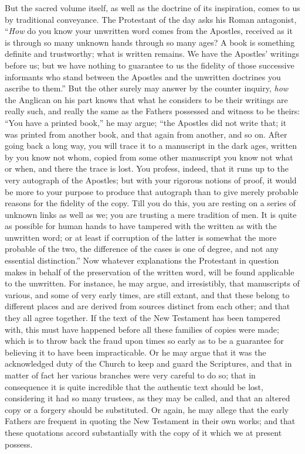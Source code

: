 But the sacred volume itself, as well as the doctrine of its
inspiration, comes to us by traditional conveyance. The Protestant of
the day asks his Roman antagonist, ``\emph{How} do you know your
unwritten word comes from the Apostles, received as it is through so
many unknown hands through so many ages? A book is something definite
and trustworthy; what is written remains. We have the Apostles'
writings before us; but we have nothing to guarantee to us the
fidelity of those successive informants who stand between the Apostles
and the unwritten doctrines you ascribe to them.'' But the other
surely may answer by the counter inquiry, \emph{how} the Anglican on
his part knows that what he considers to be their writings are really
such, and really the same as the Fathers possessed and witness to be
theirs: ``You have a printed book,'' he may argue; ``the
Apostles did not write that; it was printed from another book,
and that again from another, and so on. After going back a long way,
you will trace it to a manuscript in the dark ages, written by you
know not whom, copied from some other manuscript you know not what or
when, and there the trace is lost. You profess, indeed, that it runs
up to the very autograph of the Apostles; but with your rigorous
notions of proof, it would be more to your purpose to produce that
autograph than to give merely probable reasons for the fidelity of the
copy. Till you do this, you are resting on a series of unknown links
as well as we; you are trusting a mere tradition of men. It is quite
as possible for human hands to have tampered with the written as with
the unwritten word; or at least if corruption of the latter is
somewhat the more probable of the two, the difference of the cases is
one of degree, and not any essential distinction.'' Now whatever
explanations the Protestant in question makes in behalf of the
preservation of the written word, will be found applicable to the
unwritten. For instance, he may argue, and irresistibly, that
manuscripts of various, and some of very early times, are still
extant, and that these belong to different places and are derived from
sources distinct from each other; and that they all agree together. If
the text of the New Testament has been tampered with, this must have
happened before all these families of copies were made; which is to
throw back the fraud upon times so early as to be a guarantee for
believing it to have been impracticable. Or he may argue that it was
the acknowledged duty of the Church to keep and guard the Scriptures,
and that in matter of fact her various branches were very careful to
do so; that in consequence it is quite incredible that the authentic
text should be lost, considering it had so many trustees, as they may
be called, and that an altered copy or a forgery should be
substituted. Or again, he may allege that the early Fathers are
frequent in quoting the New Testament in their own works; and
that these quotations accord substantially with the copy of it which
we at present possess.

